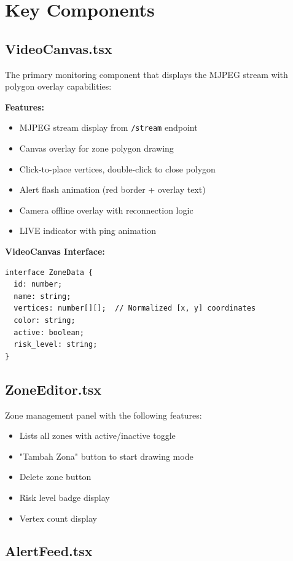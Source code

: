 \documentclass[12pt,a4paper,oneside]{book}
\begin{document}
\section{Key Components}

\subsection{VideoCanvas.tsx}

The primary monitoring component that displays the MJPEG stream with polygon overlay capabilities:

\textbf{Features:}
\begin{itemize}
    \item MJPEG stream display from \texttt{/stream} endpoint
    \item Canvas overlay for zone polygon drawing
    \item Click-to-place vertices, double-click to close polygon
    \item Alert flash animation (red border + overlay text)
    \item Camera offline overlay with reconnection logic
    \item LIVE indicator with ping animation
\end{itemize}

\textbf{VideoCanvas Interface:}
\begin{lstlisting}[style=pythonstyle]
interface ZoneData {
  id: number;
  name: string;
  vertices: number[][];  // Normalized [x, y] coordinates
  color: string;
  active: boolean;
  risk_level: string;
}
\end{lstlisting}

\subsection{ZoneEditor.tsx}

Zone management panel with the following features:
\begin{itemize}
    \item Lists all zones with active/inactive toggle
    \item "Tambah Zona" button to start drawing mode
    \item Delete zone button
    \item Risk level badge display
    \item Vertex count display
\end{itemize}

\subsection{AlertFeed.tsx}
\end{document}
